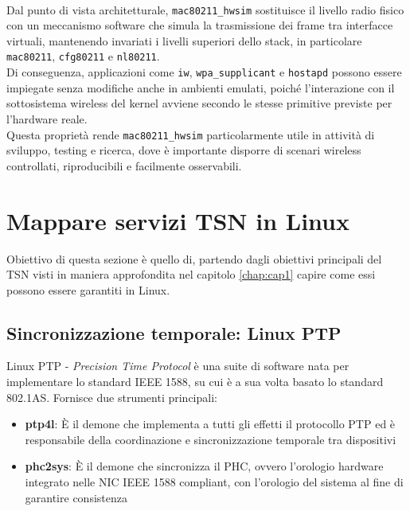\documentclass[12pt,a4paper,twoside]{book}
\newcommand{\hwsim}{\mbox{\texttt{mac80211\_hwsim}}\xspace}
\begin{document}
\begin{onehalfspace}
\begin{itemize}
    \\ 
    Dal punto di vista architetturale, \hwsim sostituisce il livello radio fisico con un meccanismo software che simula la trasmissione dei frame tra interfacce virtuali, mantenendo invariati i livelli superiori dello stack, in particolare \texttt{mac80211}, \texttt{cfg80211} e \texttt{nl80211}. 
    \\
    Di conseguenza, applicazioni come \texttt{iw}, \texttt{wpa\_supplicant} e \texttt{hostapd} possono essere impiegate senza modifiche anche in ambienti emulati, poiché l'interazione con il sottosistema wireless del kernel avviene secondo le stesse primitive previste per l'hardware reale. 
    \\
    Questa proprietà rende \hwsim particolarmente utile in attività di sviluppo, testing e ricerca, dove è importante disporre di scenari wireless controllati, riproducibili e facilmente osservabili. 
\end{itemize}

\section{Mappare servizi TSN in Linux}
Obiettivo di questa sezione è quello di, partendo dagli obiettivi principali del TSN visti in maniera approfondita nel capitolo \ref{chap:cap1} capire come essi possono essere garantiti in Linux.

\subsection{Sincronizzazione temporale: Linux PTP}
Linux PTP - \textit{Precision Time Protocol} è una suite di software nata per implementare lo standard IEEE 1588, su cui è a sua volta basato lo standard 802.1AS. Fornisce due strumenti principali:
\begin{itemize}
    \item \textbf{ptp4l}: È il demone che implementa a tutti gli effetti il protocollo PTP ed è responsabile della coordinazione e sincronizzazione temporale tra dispositivi
    \item \textbf{phc2sys}: È il demone che sincronizza il PHC, ovvero l'orologio hardware integrato nelle NIC IEEE 1588 compliant, con l'orologio del sistema al fine di garantire consistenza
\end{itemize}


\end{onehalfspace}
\end{document}
